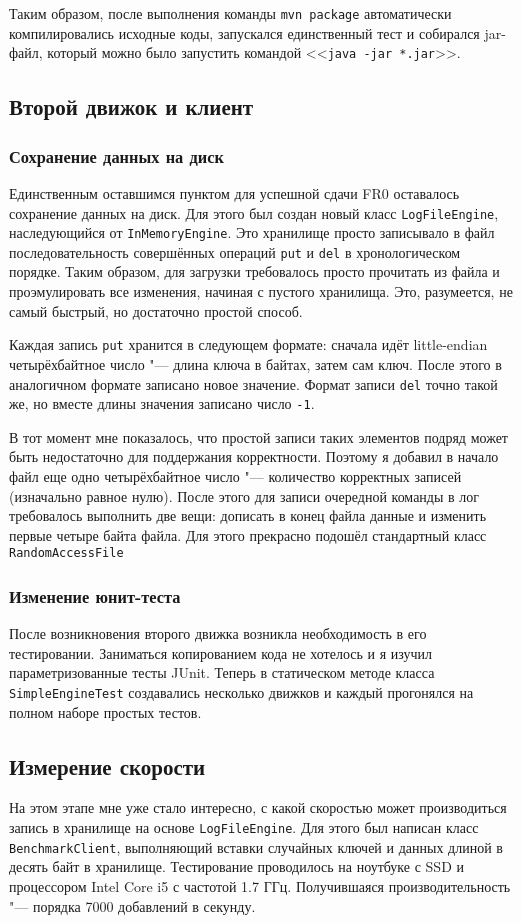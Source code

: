 \documentclass[a4paper]{article}
\renewcommand{\t}{\texttt}
\begin{document}
  Таким образом, после выполнения команды \t{mvn package} автоматически компилировались исходные коды,
  запускался единственный тест и собирался jar-файл, который можно было запустить командой <<\t{java -jar *.jar}>>.

\subsection{Второй движок и клиент}
\subsubsection{Сохранение данных на диск}
  Единственным оставшимся пунктом для успешной сдачи FR0 оставалось сохранение данных на диск. Для этого был
  создан новый класс \t{LogFileEngine}, наследующийся от \t{InMemoryEngine}. Это хранилище просто записывало
  в файл последовательность совершённых операций \t{put} и \t{del} в хронологическом порядке. Таким образом,
  для загрузки требовалось просто прочитать из файла и проэмулировать все изменения, начиная с пустого хранилища.
  Это, разумеется, не самый быстрый, но достаточно простой способ.

  Каждая запись \t{put} хранится в следующем формате: сначала идёт little-endian четырёхбайтное
  число "--- длина ключа в байтах, затем сам ключ. После этого в аналогичном формате записано новое значение.
  Формат записи \t{del} точно такой же, но вместе длины значения записано число \t{-1}.

  В тот момент мне показалось, что простой записи таких элементов подряд может быть недостаточно для поддержания
  корректности. Поэтому я добавил в начало файл еще одно четырёхбайтное число "--- количество корректных
  записей (изначально равное нулю). После этого для записи очередной команды в лог требовалось выполнить две вещи:
  дописать в конец файла данные и изменить первые четыре байта файла. Для этого прекрасно подошёл стандартный
  класс \t{RandomAccessFile}

\subsubsection{Изменение юнит-теста}
  После возникновения второго движка возникла необходимость в его тестировании. Заниматься копированием кода
  не хотелось и я изучил параметризованные тесты JUnit. Теперь в статическом методе класса \t{SimpleEngineTest}
  создавались несколько движков и каждый прогонялся на полном наборе простых тестов.

\subsection{Измерение скорости}
  На этом этапе мне уже стало интересно, с какой скоростью может производиться запись в хранилище на основе
  \t{LogFileEngine}. Для этого был написан класс \t{BenchmarkClient}, выполняющий вставки случайных ключей и
  данных длиной в десять байт в хранилище. Тестирование проводилось на ноутбуке с SSD и процессором Intel
  Core i5 с частотой 1.7 ГГц. Получившаяся производительность "--- порядка 7000 добавлений в секунду.
\end{document}
